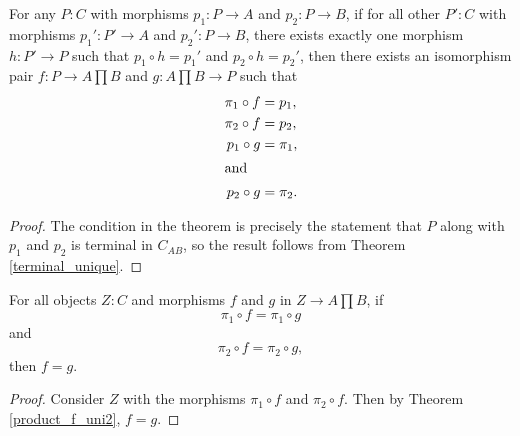 \documentclass[../../math.tex]{subfiles}
\begin{document}
\begin{theorem} \label{product_unique}
    For any $P : C$ with morphisms $p_1 : P \to A$ and $p_2 : P \to B$, if for
    all other $P' : C$ with morphisms $p_1' : P' \to A$ and $p_2' : P \to B$,
    there exists exactly one morphism $h : P' \to P$ such that $p_1 \circ h =
    p_1'$ and $p_2 \circ h = p_2'$, then there exists an isomorphism pair $f : P
    \to A \prod B$ and $g : A \prod B \to P$ such that
    \begin{align*}
        \pi_1 \circ f &= p_1, \\
        \pi_2 \circ f &= p_2, \\
        p_1 \circ g &= \pi_1, \\
    \intertext{and}
        p_2 \circ g &= \pi_2.
    \end{align*}
\end{theorem}
\begin{proof}
    The condition in the theorem is precisely the statement that $P$ along with
    $p_1$ and $p_2$ is terminal in $C_{AB}$, so the result follows from Theorem
    \ref{terminal_unique}.
\end{proof}

\begin{theorem} \label{product_mono}
    For all objects $Z : C$ and morphisms $f$ and $g$ in $Z \to A \prod B$,
    if
    \[
        \pi_1 \circ f = \pi_1 \circ g
    \]
    and
    \[
        \pi_2 \circ f = \pi_2 \circ g,
    \]
    then $f = g$.
\end{theorem}
\begin{proof}
    Consider $Z$ with the morphisms $\pi_1 \circ f$ and $\pi_2 \circ f$.  Then
    by Theorem \ref{product_f_uni2}, $f = g$.
\end{proof}
\end{document}
